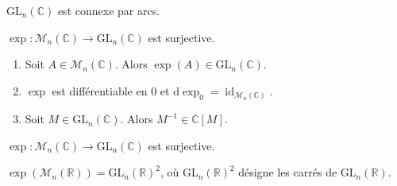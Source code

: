 
	\begin{proposition}
		$\mathrm{GL}_n(\mathbb{C})$ est connexe par arcs.
	\end{proposition}

	\begin{application}
		$\exp : \mathcal{M}_n(\mathbb{C}) \rightarrow \mathrm{GL}_n(\mathbb{C})$ est surjective.
	\end{application}


  \begin{lemma}
    \begin{enumerate}[label=(\roman*)]
      \item Soit $A \in \mathcal{M}_n(\mathbb{C})$. Alors $\exp(A) \in \mathrm{GL}_n(\mathbb{C})$.
      \item $\exp$ est différentiable en $0$ et $\mathrm{d}\exp_0 = \operatorname{id}_{\mathcal{M}_n(\mathbb{C})}$.
      \item Soit $M \in \mathrm{GL}_n(\mathbb{C})$. Alors $M^{-1} \in \mathbb{C}[M]$.
    \end{enumerate}
  \end{lemma}


  \begin{theorem}
    $\exp : \mathcal{M}_n(\mathbb{C}) \rightarrow \mathrm{GL}_n(\mathbb{C})$ est surjective.
  \end{theorem}

  \begin{application}
    $\exp(\mathcal{M}_n(\mathbb{R})) = \mathrm{GL}_n(\mathbb{R})^2$, où $\mathrm{GL}_n(\mathbb{R})^2$ désigne les carrés de $\mathrm{GL}_n(\mathbb{R})$.
  \end{application}

